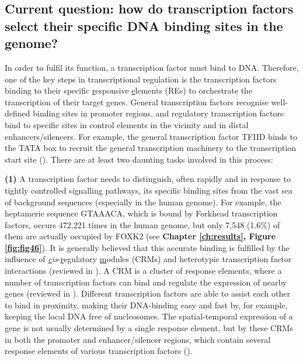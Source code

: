 \subsection{Current question: how do transcription factors select their specific DNA binding sites in the genome?}

In order to fulfil its function, a transcription factor must bind to DNA. Therefore, one of the key steps in transcriptional regulation is the transcription factors binding to their specific \underline{r}esponsive \underline{e}lements (REs) to orchestrate the transcription of their target genes. General transcription factors recognise well-defined binding sites in promoter regions, and regulatory transcription factors bind to specific sites in control elements in the vicinity and in distal enhancers/silencers. For example, the general transcription factor TFIID binds to the TATA box to recruit the general transcription machinery to the transcription start site (\cite{thomas2006the}). There are at least two daunting tasks involved in this process:

\textbf{(1)} A transcription factor needs to distinguish, often rapidly and in response to tightly controlled signalling pathways, its specific binding sites from the vast sea of background sequences (especially in the human genome). For example, the heptameric sequence GTAAACA, which is bound by Forkhead transcription factors, occurs 472,221 times in the human genome, but only 7,548 (1.6\%) of them are actually occupied by FOXK2 (see \textbf{Chapter \ref{ch:results}, Figure \ref{fig:fig46}}). It is generally believed that this accurate binding is fulfilled by the influence of \textit{\underline{c}is}-\underline{r}egulatory \underline{m}odules (CRMs) and heterotypic transcription factor interactions (reviewed in \cite{farnham2009insights}). A CRM is a cluster of response elements, where a number of transcription factors can bind and regulate the expression of nearby genes (reviewed in \cite{ben-tabou-de-leon2007gene}). Different transcription factors are able to assist each other to bind in proximity, making their DNA-binding easy and fast by, for example, keeping the local DNA free of nucleosomes. The spatial-temporal expression of a gene is not usually determined by a single response element, but by these CRMs in both the promoter and enhancer/silencer regions, which contain several response elements of various transcription factors (\cite{farnham2009insights}).

